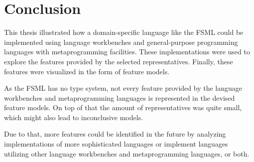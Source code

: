\chapter{Conclusion}

This thesis illustrated how a domain-specific language like the FSML could be implemented using language workbenches and general-purpose programming languages with metaprogramming facilities.
These implementations were used to explore the features provided by the selected representatives.
Finally, these features were visualized in the form of feature models.

As the FSML has no type system, not every feature provided by the language workbenches and metaprogramming languages is represented in the devised feature models.
On top of that the amount of representatives was quite small, which might also lead to inconclusive models.

Due to that, more features could be identified in the future by analyzing implementations of more sophisticated languages or implement languages utilizing other language workbenches and metaprogramming languages, or both.
